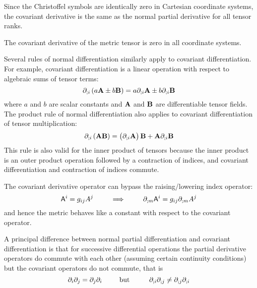 \begin{df}
\begin{itemize}
 \end{itemize}

\end{df}

 Since the Christoffel symbols are identically zero in Cartesian
coordinate systems, the covariant derivative is the same as the normal
partial derivative for all tensor ranks.

 The covariant derivative of the metric tensor is zero in
all coordinate systems.

 Several rules of normal differentiation similarly apply
to covariant differentiation. For example, covariant differentiation
is a linear operation with respect to algebraic sums of tensor terms:
\begin{equation}
\partial_{;i}\left(a\mathbf{ A}\pm b\mathbf{ B}\right)=a\partial_{;i}\mathbf{ A}\pm 
b\partial_{;i}\mathbf{ B}
\end{equation}
where $a$ and $b$ are scalar constants and $\mathbf{ A}$ and $\mathbf{ B}$
are differentiable tensor fields. The product rule of normal differentiation
also applies to covariant differentiation of tensor multiplication:
\begin{equation}
\partial_{;i}\left(\mathbf{ A}\mathbf{ B}\right)=\left(\partial_{;i}\mathbf{ A}
\right)\mathbf{ B}+\mathbf{ A}\partial_{;i}\mathbf{ B}
\end{equation}
This rule is also valid for the inner product of tensors because the
inner product is an outer product operation followed by a contraction
of indices, and covariant differentiation and contraction of indices
commute.

 The covariant derivative operator can bypass the raising/lowering
index operator:
\begin{equation}
\mathsf{A}^i=g_{ij}A^{j}\,\,\,\,\,\,\,\,\,\,\,\,\,\,\,\Longrightarrow\,\,\,\,\,\,\,\,\,
\,\,\,\,\,\,\partial_{;m}\mathsf{A}^i=g_{ij}\partial_{;m}A^{j}
\end{equation}
and hence the metric behaves like a constant with respect to the covariant
operator.

 A principal difference between normal partial differentiation
and covariant differentiation is that for successive differential
operations the partial derivative operators do commute with each other
(assuming certain continuity conditions) but the covariant operators
do not commute, that is
\begin{equation}
\partial_{i}\partial_{j}=\partial_{j}\partial_{i}\,\,\,\,\,\,\,\,\,\,\,\,\,\,\,
\text{but 
\,\,\,\,\,\,\,\,\,\,\,\,\,\,\,}\partial_{;i}\partial_{;j}\ne\partial_{;j}
\partial_{;i}
\end{equation}


